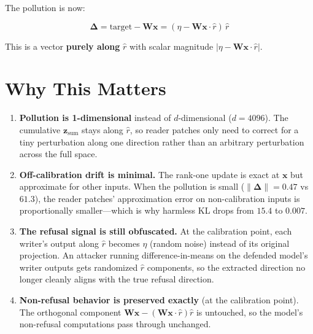 \documentclass[11pt]{article}
\begin{document}
The pollution is now:

\begin{equation}
    \boldsymbol{\Delta} = \text{target} - \mathbf{W}\mathbf{x} = (\eta - \mathbf{W}\mathbf{x} \cdot \hat{r})\,\hat{r}
\end{equation}

This is a vector \textbf{purely along} $\hat{r}$ with scalar magnitude $|\eta - \mathbf{W}\mathbf{x} \cdot \hat{r}|$.

\section{Why This Matters}

\begin{enumerate}[leftmargin=*, label=\textbf{\arabic*.}]
    \item \textbf{Pollution is 1-dimensional} instead of $d$-dimensional ($d = 4096$). The cumulative $\mathbf{z}_{\text{sum}}$ stays along $\hat{r}$, so reader patches only need to correct for a tiny perturbation along one direction rather than an arbitrary perturbation across the full space.

    \item \textbf{Off-calibration drift is minimal.} The rank-one update is exact at $\mathbf{x}$ but approximate for other inputs. When the pollution is small ($\|\boldsymbol{\Delta}\| = 0.47$ vs $61.3$), the reader patches' approximation error on non-calibration inputs is proportionally smaller---which is why harmless KL drops from $15.4$ to $0.007$.

    \item \textbf{The refusal signal is still obfuscated.} At the calibration point, each writer's output along $\hat{r}$ becomes $\eta$ (random noise) instead of its original projection. An attacker running difference-in-means on the defended model's writer outputs gets randomized $\hat{r}$ components, so the extracted direction no longer cleanly aligns with the true refusal direction.

    \item \textbf{Non-refusal behavior is preserved exactly} (at the calibration point). The orthogonal component $\mathbf{W}\mathbf{x} - (\mathbf{W}\mathbf{x} \cdot \hat{r})\hat{r}$ is untouched, so the model's non-refusal computations pass through unchanged.
\end{enumerate}
\end{document}
